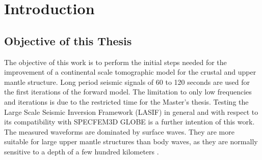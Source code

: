

\chapter{Introduction}

\section{Objective of this Thesis} %

The objective of this work is to perform the initial steps needed for the improvement of a continental scale tomographic model for the crustal and upper mantle structure.
Long period seismic signals of 60 to 120 seconds %
are used for the first iterations of the forward model. 
The limitation to only low frequencies and %
iterations is due to the restricted time for the Master's thesis.
Testing the Large Scale Seismic Inversion Framework (LASIF) in general and with respect to its compatibility with SPECFEM3D 
GLOBE is a further intention of this work.
The measured waveforms are dominated by surface waves. 
They are more suitable for large upper mantle structures than body waves, as they are normally sensitive to a depth of a few 
hundred kilometers \citep{Morelli2004}.

